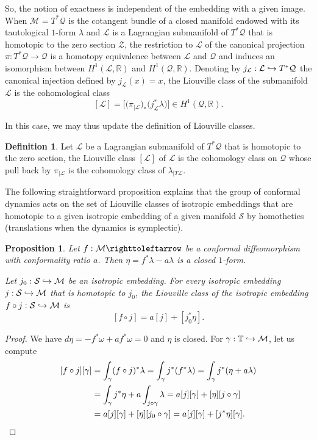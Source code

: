 \documentclass[JEP,XML,SOM,Unicode,published]{cedram}
\def\hto{\mathrel{\lhook\joinrel\to}}
\newtheorem{proposition}{Proposition}
\theoremstyle{definition}
\newtheorem{definition}[theorem]{Definition}
\def\R{\mathbb{R}}
\def\T{\mathbb{T}}
\def\cL{{\mathcal L}}
\def\cM{{\mathcal M}}
\def\cQ{{\mathcal Q}}
\def\cS{{\mathcal S}}
\def\cZ{{\mathcal Z}}
\begin{document}
So, the notion of exactness is independent of the embedding with a given image. When $\cM=T^*\cQ$ is the cotangent bundle of a closed manifold endowed with its tautological $1$-form $\lambda$ and $\cL$ is a Lagrangian submanifold of $T^*\cQ$ that is homotopic to the zero section $\cZ$, the restriction to $\cL$ of the canonical projection $\pi:T^*\cQ\to \cQ$ is a homotopy equivalence between $\cL$ and $\cQ$ and induces an isomorphism between $H^1(\cL,\R)$ and $H^1(\cQ,\R)$. Denoting by $j_\cL:\cL\hto T^*\cQ$ the canonical injection defined by $j_\cL(x)=x$, the Liouville class of the submanifold $\cL$ is the cohomological class
\[
[\cL]=\Big[\big(\pi_{|\cL}\big)_*\big(j_\cL^*\lambda\big)\Big]\in H^1(\cQ,\R).
\]

In this case, we may thus update the definition of Liouville classes.

\begin{definition}
Let $\cL$ be a Lagrangian submanifold of $T^*\cQ$ that is homotopic to the zero section, the Liouville class $[\cL]$ of $\cL$ is the cohomology class on $\cQ$ whose pull back by $\pi_{|\cL}$ is the cohomology class of $\lambda_{|T\cL}$.
\end{definition}

The following straightforward proposition explains that the group of conformal dynamics acts {on the set of} Liouville classes of isotropic embeddings { that are homotopic to a given isotropic embedding } of a given manifold $\cS$ by homotheties (translations when the dynamics is symplectic).

\begin{proposition}\label{Phomothety}
Let $f: \cM \righttoleftarrow$ be a conformal diffeomorphism with conformality ratio $a$. Then $\eta=f^*\lambda-a\lambda$ is a closed $1$-form.

Let $ j_0:\cS\hto\cM$ be an isotropic embedding. For every isotropic embedding $ j:\cS\hto\cM$ that is homotopic to $j_0$, the Liouville class of the isotropic embedding $f\circ j:\cS\hto\cM$ is
\[
[f\circ j]=a[j]+[j_0^*\eta].
\]
\end{proposition}

\begin{proof}
We have $d\eta=-f^*\omega+af^*\omega=0$ and $\eta$ is closed. 
For $\gamma:\T\hto\cM$, let us compute
\[
\begin{split}
[f\circ j][\gamma]&=\int_\gamma(f\circ j)^*\lambda=\int_\gamma j^*(f^*\lambda)=\int_\gamma j^*(\eta +a\lambda)\\
&=\int_\gamma j^*\eta+a\int_{j\circ\gamma} \lambda=a[j][\gamma]+ [\eta][j\circ\gamma]\\
&=a[j][\gamma]+ [\eta][j_0\circ\gamma]=a[j][\gamma]+ [j^*\eta][\gamma].\qedhere
\end{split}
\]
\end{proof}
\end{document}
